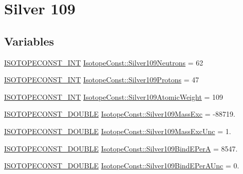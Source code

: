 \hypertarget{group___isotope_const-_silver-_ag109}{}\section{Silver 109}
\label{group___isotope_const-_silver-_ag109}
\subsection*{Variables}
\begin{DoxyCompactItemize}
\item 
\mbox{\hyperlink{group___isotope_const-_macros_ga5f18360b3e99483a35c32d789e62621c}{I\+S\+O\+T\+O\+P\+E\+C\+O\+N\+S\+T\+\_\+\+I\+NT}} \mbox{\hyperlink{group___isotope_const-_silver-_ag109_ga5bf4d68a389e8d452e3843b223ca7039}{Isotope\+Const\+::\+Silver109\+Neutrons}} = 62
\item 
\mbox{\hyperlink{group___isotope_const-_macros_ga5f18360b3e99483a35c32d789e62621c}{I\+S\+O\+T\+O\+P\+E\+C\+O\+N\+S\+T\+\_\+\+I\+NT}} \mbox{\hyperlink{group___isotope_const-_silver-_ag109_ga47fc0ccd84408b3661480d4feb0bfcce}{Isotope\+Const\+::\+Silver109\+Protons}} = 47
\item 
\mbox{\hyperlink{group___isotope_const-_macros_ga5f18360b3e99483a35c32d789e62621c}{I\+S\+O\+T\+O\+P\+E\+C\+O\+N\+S\+T\+\_\+\+I\+NT}} \mbox{\hyperlink{group___isotope_const-_silver-_ag109_gad4844dfc786863731d2b74c613277413}{Isotope\+Const\+::\+Silver109\+Atomic\+Weight}} = 109
\item 
\mbox{\hyperlink{group___isotope_const-_macros_ga8f45a7272ce02c0b4c65c44636ed719a}{I\+S\+O\+T\+O\+P\+E\+C\+O\+N\+S\+T\+\_\+\+D\+O\+U\+B\+LE}} \mbox{\hyperlink{group___isotope_const-_silver-_ag109_ga0cc2da79fa9854bde4153cb1c45bdadd}{Isotope\+Const\+::\+Silver109\+Mass\+Exc}} = -\/88719.
\item 
\mbox{\hyperlink{group___isotope_const-_macros_ga8f45a7272ce02c0b4c65c44636ed719a}{I\+S\+O\+T\+O\+P\+E\+C\+O\+N\+S\+T\+\_\+\+D\+O\+U\+B\+LE}} \mbox{\hyperlink{group___isotope_const-_silver-_ag109_gab2cb5dcf7c156f449febb581b333296c}{Isotope\+Const\+::\+Silver109\+Mass\+Exc\+Unc}} = 1.
\item 
\mbox{\hyperlink{group___isotope_const-_macros_ga8f45a7272ce02c0b4c65c44636ed719a}{I\+S\+O\+T\+O\+P\+E\+C\+O\+N\+S\+T\+\_\+\+D\+O\+U\+B\+LE}} \mbox{\hyperlink{group___isotope_const-_silver-_ag109_ga926471ec3f1e6fc618c33fa1352fef14}{Isotope\+Const\+::\+Silver109\+Bind\+E\+PerA}} = 8547.
\item 
\mbox{\hyperlink{group___isotope_const-_macros_ga8f45a7272ce02c0b4c65c44636ed719a}{I\+S\+O\+T\+O\+P\+E\+C\+O\+N\+S\+T\+\_\+\+D\+O\+U\+B\+LE}} \mbox{\hyperlink{group___isotope_const-_silver-_ag109_ga598c0c4ccbd33ac1d4206250d98c463f}{Isotope\+Const\+::\+Silver109\+Bind\+E\+Per\+A\+Unc}} = 0.

\end{DoxyCompactItemize}
